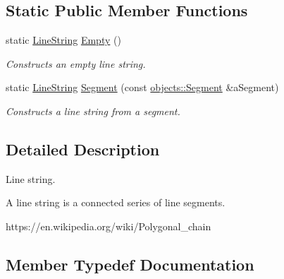 \subsection*{Static Public Member Functions}
\begin{DoxyCompactItemize}
\item 
static \hyperlink{classlibrary_1_1math_1_1geom_1_1d2_1_1objects_1_1_line_string}{Line\+String} \hyperlink{classlibrary_1_1math_1_1geom_1_1d2_1_1objects_1_1_line_string_af8a783642dc4ba67d4e0ca2140cda343}{Empty} ()
\begin{DoxyCompactList}\small\item\em Constructs an empty line string. \end{DoxyCompactList}\item 
static \hyperlink{classlibrary_1_1math_1_1geom_1_1d2_1_1objects_1_1_line_string}{Line\+String} \hyperlink{classlibrary_1_1math_1_1geom_1_1d2_1_1objects_1_1_line_string_a382892044a21b1b7e2717117adef35db}{Segment} (const \hyperlink{classlibrary_1_1math_1_1geom_1_1d2_1_1objects_1_1_segment}{objects\+::\+Segment} \&a\+Segment)
\begin{DoxyCompactList}\small\item\em Constructs a line string from a segment. \end{DoxyCompactList}\end{DoxyCompactItemize}


\subsection{Detailed Description}
Line string. 

A line string is a connected series of line segments.

https\+://en.wikipedia.\+org/wiki/\+Polygonal\+\_\+chain 

\subsection{Member Typedef Documentation}
\mbox{\label{classlibrary_1_1math_1_1geom_1_1d2_1_1objects_1_1_line_string_a7c7a81b557da8ed855b5f4b88a5fa837}} 
